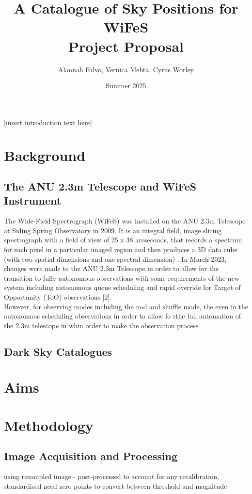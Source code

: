 \documentclass[11pt]{article}
\title{%
    \huge A Catalogue of Sky Positions for WiFeS \\
    \Large \textbf{Project Proposal}}
\author{Alannah Falvo, Vernica Mehta, Cyrus Worley}
\date{Summer 2025}
\begin{document}
\maketitle

[insert introduction text here] \\

\section{Background}
\subsection{The ANU 2.3m Telescope and WiFeS Instrument}
The Wide-Field Spectrograph (WiFeS) was installed on the ANU 2.3m Telescope at Siding Spring Observatory in 2009. It is an integral field, image slicing spectrograph with a field of view of 25 x 38 arcseconds, that records a spectrum for each pixel in a particular imaged region and then produces a 3D data cube (with two spatial dimensions and one spectral dimension) \cite{dopita_wide_2007}.  In March 2023, changes were made to the ANU 2.3m Telescope in order to allow for the transition to fully autonomous observations with some requirements of the new system including autonomous queue scheduling and rapid override for Target of Opportunity (ToO) observations [2]. \\

However, for observing modes including the nod and shuffle mode, the even in the autonomous scheduling observations  in order to allow fo rthe full automation of the 2.3m telescope in whin order to make the observation process 
\subsection{Dark Sky Catalogues}

\section{Aims}

\section{Methodology}
\subsection{Image Acquisition and Processing}
using resampled image - post-processed to account for any recalibration, standardised 
need zero points to convert between threshold and magnitude 
\end{document}
